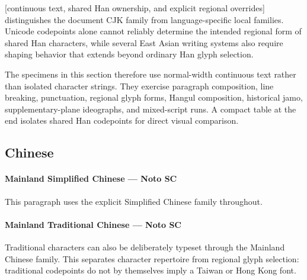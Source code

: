 [continuous text, shared Han ownership, and explicit regional overrides]
distinguishes the document CJK family from language-specific local families.
Unicode codepoints alone cannot reliably determine the intended regional form
of shared Han characters, while several East Asian writing systems also
require shaping behavior that extends beyond ordinary Han glyph selection.

The specimens in this section therefore use normal-width continuous text
rather than isolated character strings. They exercise paragraph composition,
line breaking, punctuation, regional glyph forms, Hangul composition,
historical jamo, supplementary-plane ideographs, and mixed-script runs.
A compact table at the end isolates shared Han codepoints for direct visual
comparison.


\subsection{Chinese}

\paragraph{Mainland Simplified Chinese --- Noto SC}

This paragraph uses the explicit Simplified Chinese family throughout.



\paragraph{Mainland Traditional Chinese --- Noto SC}

Traditional characters can also be deliberately typeset through the Mainland
Chinese family. This separates character repertoire from regional glyph
selection: traditional codepoints do not by themselves imply a Taiwan or
Hong Kong font.

